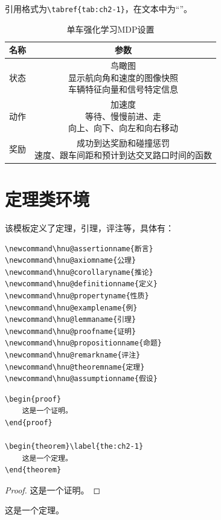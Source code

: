 引用格式为\lstinline!\tabref{tab:ch2-1}!，在文本中为“”。
\begin{table}[htb]
  \centering
  \caption{单车强化学习MDP设置}
  \label{tab:ch2-1}
  \begin{tabular}{cc}
	\toprule[1.5pt]
	名称 & 参数  \\ 
	\midrule[0.75pt]
	状态 & \makecell{鸟瞰图 \\ 显示航向角和速度的图像快照 \\ 车辆特征向量和信号特定信息} \\
	动作 &  \makecell{加速度 \\ 等待、慢慢前进、走 \\ 向上、向下、向左和向右移动} \\
	奖励 & \makecell{成功到达奖励和碰撞惩罚 \\ 速度、跟车间距和预计到达交叉路口时间的函数} \\
	\bottomrule[1.5pt]
  \end{tabular}
\end{table}

\section{定理类环境}
该模板定义了定理，引理，评注等，具体有：
\begin{lstlisting}
\newcommand\hnu@assertionname{断言}
\newcommand\hnu@axiomname{公理}
\newcommand\hnu@corollaryname{推论}
\newcommand\hnu@definitionname{定义}
\newcommand\hnu@propertyname{性质}
\newcommand\hnu@examplename{例}
\newcommand\hnu@lemmaname{引理}
\newcommand\hnu@proofname{证明}
\newcommand\hnu@propositionname{命题}
\newcommand\hnu@remarkname{评注}
\newcommand\hnu@theoremname{定理}
\newcommand\hnu@assumptionname{假设}
\end{lstlisting}

\begin{lstlisting}
\begin{proof}
	这是一个证明。
\end{proof}

\begin{theorem}\label{the:ch2-1}
	这是一个定理。
\end{theorem}
\end{lstlisting}

\begin{proof}
	这是一个证明。
\end{proof}

\begin{theorem}\label{the:ch2-1}
	这是一个定理。
\end{theorem}

